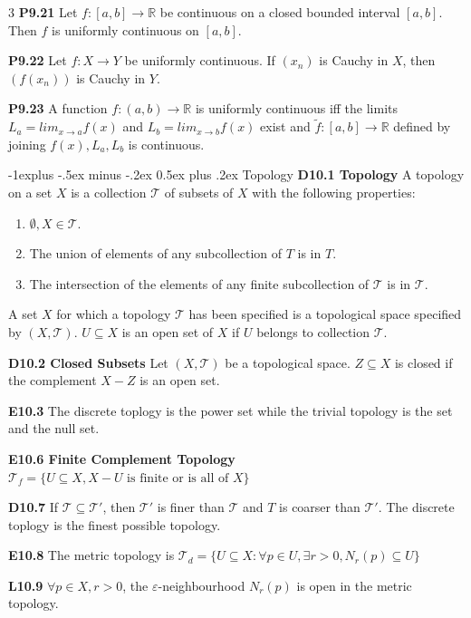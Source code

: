 \documentclass[10pt, landscape]{article}
\makeatletter
\renewcommand{\section}{\@startsection{section}{1}{0mm}%
                                {-1ex plus -.5ex minus -.2ex}%
                                {0.5ex plus .2ex}%
                                {\normalfont\large\bfseries}}
\renewcommand{\section}{\@startsection{section}{2}{0mm}%
                                {-1explus -.5ex minus -.2ex}%
                                {0.5ex plus .2ex}%
                                {\normalfont\normalsize\bfseries}}
\makeatother
\begin{document}
\begin{multicols*}{3}
\textbf{P9.21} Let $f:[a,b]\rightarrow \mathbb{R}$ be continuous on a closed bounded interval $[a,b]$. Then $f$ is uniformly continuous on $[a,b]$.

\textbf{P9.22} Let $f:X\rightarrow Y$ be uniformly continuous. If $(x_n)$ is Cauchy in $X$, then $(f(x_n))$ is Cauchy in $Y$.

\textbf{P9.23} A function $f:(a,b)\rightarrow\mathbb{R}$ is uniformly continuous iff the limits $L_a = lim_{x \rightarrow a}f(x)$ and $L_b=lim_{x\rightarrow b}f(x)$ exist and $\tilde{f} : [a,b] \rightarrow \mathbb{R}$ defined by joining $f(x), L_a, L_b$ is continuous.

\section{Topology}
\textbf{D10.1 Topology} A topology on a set $X$ is a collection $\mathcal{T}$ of subsets of $X$ with the following properties:
\begin{enumerate}
    \item $\emptyset, X \in \mathcal{T}$.
    \item The union of elements of any subcollection of $T$ is in $T$.
    \item The intersection of the elements of any finite subcollection of $\mathcal{T}$ is in $\mathcal{T}$.
\end{enumerate}
A set $X$ for which a topology $\mathcal{T}$ has been specified is a topological space specified by $(X, \mathcal{T})$. $U \subseteq X$ is an open set of $X$ if $U$ belongs to collection $\mathcal{T}$.

\textbf{D10.2 Closed Subsets} Let $(X, \mathcal{T})$ be a topological space. $Z \subseteq X$ is closed if the complement $X-Z$ is an open set.

\textbf{E10.3} The discrete toplogy is the power set while the trivial topology is the set and the null set.

\textbf{E10.6 Finite Complement Topology} $\mathcal{T}_f=\{U \subseteq X, X-U \text{ is finite or is all of }X\}$

\textbf{D10.7} If $\mathcal{T} \subseteq \mathcal{T}'$, then $\mathcal{T}'$ is finer than $\mathcal{T}$ and $T$ is coarser than $\mathcal{T}'$. The discrete toplogy is the finest possible topology.

\textbf{E10.8} The metric topology is $\mathcal{T}_d=\{U \subseteq X : \forall p \in U, \exists r > 0, N_r(p) \subseteq U\}$

\textbf{L10.9} $\forall p \in X, r > 0$, the $\varepsilon$-neighbourhood $N_r(p)$ is open in the metric topology.


\end{multicols*}
\end{document}
